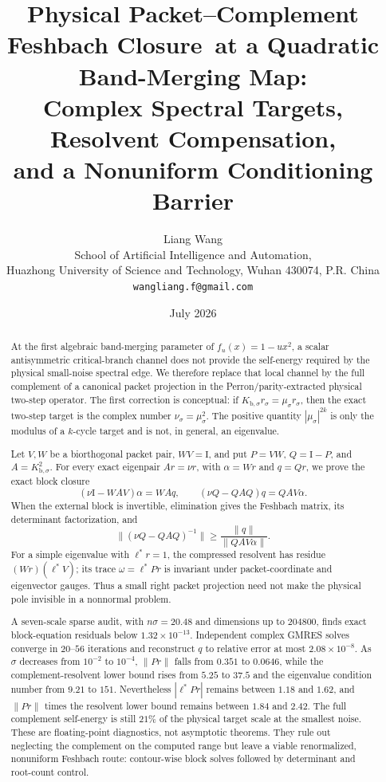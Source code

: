 \documentclass[11pt]{article}
\title{\textbf{Physical Packet--Complement Feshbach Closure}\
\textbf{at a Quadratic Band-Merging Map:}\\[0.35em]
\large Complex Spectral Targets, Resolvent Compensation,\\
and a Nonuniform Conditioning Barrier}
\author{Liang Wang\\
\small School of Artificial Intelligence and Automation,\\[-0.2em]
\small Huazhong University of Science and Technology, Wuhan 430074, P.R. China\\
\small \texttt{wangliang.f@gmail.com}}
\date{July 2026}
\theoremstyle{definition}
\theoremstyle{remark}
\newcommand{\Id}{\mathrm I}
\begin{document}
\maketitle

\begin{abstract}
At the first algebraic band-merging parameter of
$f_u(x)=1-u x^2$, a scalar antisymmetric critical-branch channel does not
provide the self-energy required by the physical small-noise spectral edge.
We therefore replace that local channel by the full complement of a
canonical packet projection in the Perron/parity-extracted physical
two-step operator.  The first correction is conceptual: if
$K_{\mathrm b,\sigma}r_\sigma=\mu_\sigma r_\sigma$, then the exact
two-step target is the complex number
$\nu_\sigma=\mu_\sigma^2$.  The positive quantity
$|\mu_\sigma|^{2k}$ is only the modulus of a $k$-cycle target and is not, in
general, an eigenvalue.

Let $V,W$ be a biorthogonal packet pair, $WV=\Id$, and put
$P=VW$, $Q=\Id-P$, and $A=K_{\mathrm b,\sigma}^2$.  For every exact
eigenpair $Ar=\nu r$, with $\alpha=Wr$ and $q=Qr$, we prove the exact block
closure
\[
 (\nu\Id-WAV)\alpha=WAq,
 \qquad
 (\nu Q-QAQ)q=QAV\alpha.
\]
When the external block is invertible, elimination gives the Feshbach
matrix, its determinant factorization, and
\[
 \|(\nu Q-QAQ)^{-1}\|
 \ge \frac{\|q\|}{\|QAV\alpha\|}.
\]
For a simple eigenvalue with $\ell^*r=1$, the compressed resolvent has
residue $(Wr)(\ell^*V)$; its trace
$\omega=\ell^*Pr$ is invariant under packet-coordinate and eigenvector
gauges.  Thus a small right packet projection need not make the physical
pole invisible in a nonnormal problem.

A seven-scale sparse audit, with $n\sigma=20.48$ and dimensions up to
$204800$, finds exact block-equation residuals below
$1.32\times10^{-13}$.  Independent complex GMRES solves converge in
$20$--$56$ iterations and reconstruct $q$ to relative error at most
$2.08\times10^{-8}$.  As $\sigma$ decreases from $10^{-2}$ to $10^{-4}$,
$\|Pr\|$ falls from $0.351$ to $0.0646$, while the complement-resolvent
lower bound rises from $5.25$ to $37.5$ and the eigenvalue condition number
from $9.21$ to $151$.  Nevertheless $|\ell^*Pr|$ remains between $1.18$
and $1.62$, and $\|Pr\|$ times the resolvent lower bound remains between
$1.84$ and $2.42$.  The full complement self-energy is still $21\%$ of the
physical target scale at the smallest noise.  These are floating-point
diagnostics, not asymptotic theorems.  They rule out neglecting the
complement on the computed range but leave a viable renormalized,
nonuniform Feshbach route: contour-wise block solves followed by
determinant and root-count control.
\end{abstract}
\end{document}
